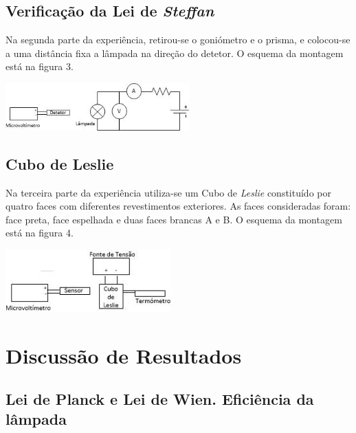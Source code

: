 \documentclass[9pt]{extarticle}
\begin{document}
\begin{multicols}{2}
\subsection{Verificação da Lei de \textit{Steffan}}
\par Na segunda parte da experiência, retirou-se o goniómetro e o prisma, e colocou-se a uma distância fixa a lâmpada na direção do detetor. O esquema da montagem está na figura 3.

\begin{center}
\includegraphics[width=200pt]{parte2.jpg}
\begin{center}
\par{}
\end{center}
\end{center}

\subsection{Cubo de Leslie}
Na terceira parte da experiência utiliza-se um Cubo de \textit{Leslie} constituído por quatro faces com diferentes revestimentos exteriores. As faces consideradas foram: face preta, face espelhada e duas faces brancas A e B. O esquema da montagem está na figura 4.

\begin{center}
\includegraphics[width=180pt]{parte3.jpg}
\begin{center}
\par{}
\end{center}
\end{center}


\section{Discussão de Resultados}

\subsection{Lei de Planck e Lei de Wien. Eficiência da lâmpada}


\end{multicols}
\end{document}
